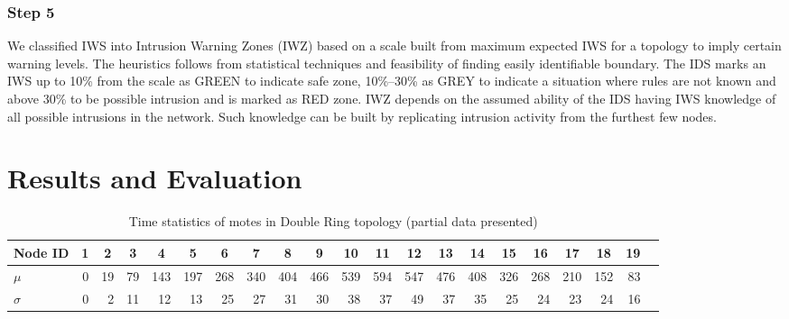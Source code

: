 \documentclass[conference]{IEEEtran}
\newcommand*{\bd}[1]{\multicolumn{1}{|c|}{\bfseries #1}}
\begin{document}
\subsubsection*{Step 5} 
We classified IWS into Intrusion Warning Zones (IWZ) based on a scale built from maximum expected IWS for a topology to imply certain warning levels.
The heuristics follows from statistical techniques and feasibility of finding easily identifiable boundary.
The IDS marks an IWS up to 10\% from the scale as GREEN to indicate safe zone,
10\%--30\% as GREY to indicate a situation where rules are not known and 
above 30\% to be possible intrusion and is marked as RED zone.
IWZ depends on the assumed ability of the IDS having IWS knowledge of all possible intrusions in the network.
Such knowledge can be built by replicating intrusion activity from the furthest few nodes.

\section{Results and Evaluation}
\label{sec:eval}

\begin{table}[t!]
\centering
\begin{tabular}{|l|*{19}{r|}r|}
\hline
\bd{Node ID}           & \bd{1} & \bd{2} & \bd{3} & \bd{4} & \bd{5} & \bd{6} & \bd{7} & \bd{8} & \bd{9} & \bd{10} & \bd{11} & \bd{12} & \bd{13} & \bd{14} & \bd{15} & \bd{16} & \bd{17} & \bd{18} & \bd{19} \\ %
\hline
$\mu$            & 0 &19 & 79& 143&197 &268&340&404&466&539 &594 &547 &476 &408 &326 & 268&210 & 152 & 83 \\ %
$\sigma$		 & 0 & 2 & 11 & 12 & 13 & 25& 27&31 &30 & 38 & 37 & 49 & 37 & 35 & 25  & 24 & 23 & 24 & 16 \\ %
\hline
\end{tabular}
\caption{Time statistics of motes in Double Ring topology (partial data presented)}
\label{tab:stat_ellip}
\end{table}

\end{document}
